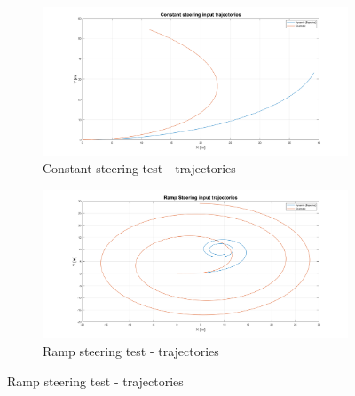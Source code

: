 \begin{figure}[H]
    \begin{subfigure}{.5\textwidth}
    \centering
   \includegraphics[width=1.1\textwidth,keepaspectratio]{Figures/Const_steer_traj.png}
   \caption{Constant steering test - trajectories}
   \label{subfig:const_steer}
    \end{subfigure}%
    \begin{subfigure}{.5\textwidth}
    \centering
    \includegraphics[width=1.1\textwidth,keepaspectratio]{Figures/Ramp_traj.png}
    \caption{Ramp steering test - trajectories}
    \label{subfig:ramp_steer}
    \end{subfigure}
    
     \vspace{10mm}
     

\end{figure}
